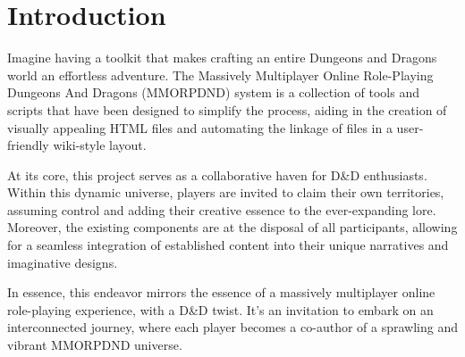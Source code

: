 \chapter{Introduction}
\thispagestyle{fancy}  %

Imagine having a toolkit that makes crafting an entire Dungeons and Dragons world an effortless adventure. The Massively Multiplayer Online Role-Playing Dungeons And Dragons (MMORPDND) system is a collection of tools and scripts that have been designed to simplify the process, aiding in the creation of visually appealing HTML files and automating the linkage of files in a user-friendly wiki-style layout.

At its core, this project serves as a collaborative haven for D\&D enthusiasts. Within this dynamic universe, players are invited to claim their own territories, assuming control and adding their creative essence to the ever-expanding lore. Moreover, the existing components are at the disposal of all participants, allowing for a seamless integration of established content into their unique narratives and imaginative designs.

In essence, this endeavor mirrors the essence of a massively multiplayer online role-playing experience, with a D\&D twist. It's an invitation to embark on an interconnected journey, where each player becomes a co-author of a sprawling and vibrant MMORPDND universe.
